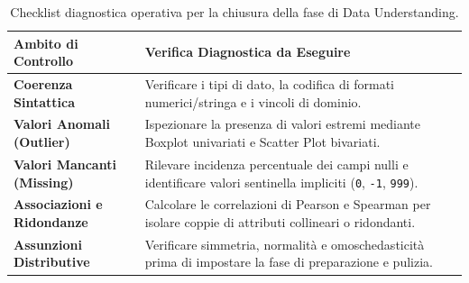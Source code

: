 \begin{table}[H]
    \centering
    \small
    \begin{tabularx}{\textwidth}{lX}
        \toprule
        \textbf{Ambito di Controllo} & \textbf{Verifica Diagnostica da Eseguire} \\
        \midrule
        \textbf{Coerenza Sintattica} & Verificare i tipi di dato, la codifica di formati numerici/stringa e i vincoli di dominio. \\
        \textbf{Valori Anomali (Outlier)} & Ispezionare la presenza di valori estremi mediante Boxplot univariati e Scatter Plot bivariati. \\
        \textbf{Valori Mancanti (Missing)} & Rilevare incidenza percentuale dei campi nulli e identificare valori sentinella impliciti (\texttt{0}, \texttt{-1}, \texttt{999}). \\
        \textbf{Associazioni e Ridondanze} & Calcolare le correlazioni di Pearson e Spearman per isolare coppie di attributi collineari o ridondanti. \\
        \textbf{Assunzioni Distributive} & Verificare simmetria, normalità e omoschedasticità prima di impostare la fase di preparazione e pulizia. \\
        \bottomrule
    \end{tabularx}
    \caption{Checklist diagnostica operativa per la chiusura della fase di Data Understanding.}
    \label{tab:dm-du-checklist}
\end{table}
